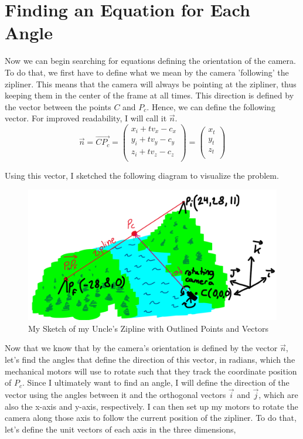 \documentclass[12pt]{article}
\begin{document}
\section{Finding an Equation for Each Angle}

Now we can begin searching for equations defining the orientation of the camera. To do that, we first have to define what we mean by the camera 'following' the zipliner. This means that the camera will always be pointing at the zipliner, thus keeping them in the center of the frame at all times. This direction is defined by the vector between the points $C$ and $P_c$. Hence, we can define the following vector. For improved readability, I will call it $\vec n$.
$$\vec n = \overrightarrow{CP_c} = \begin{pmatrix} x_i + tv_x - c_x \\ y_i + tv_y - c_y \\ z_i + tv_z - c_z \\
\end{pmatrix} = \begin{pmatrix} x_t \\ y_t \\ z_t \\
\end{pmatrix}$$

Using this vector, I sketched the following diagram to visualize the problem.

\begin{figure}[H]
\centering
\includegraphics[width=450pt]{img/annotation1.png}
\caption{\label{fig:4}My Sketch of my Uncle's Zipline with Outlined Points and Vectors}
\end{figure}

Now that we know that by the camera's orientation is defined by the vector $\vec n$, let's find the angles that define the direction of this vector, in radians, which the mechanical motors will use to rotate such that they track the coordinate position of $P_c$. Since I ultimately want to find an angle, I will define the direction of the vector using the angles between it and the orthogonal vectors $\vec i$ and $\vec j$, which are also the x-axis and y-axis, respectively. I can then set up my motors to rotate the camera along those axis to follow the current position of the zipliner. To do that, let's define the unit vectors of each axis in the three dimensions, 
\end{document}
